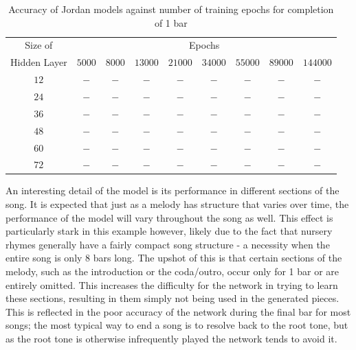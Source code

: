 \documentclass[ author={Stephen Livermore-Tozer},
				supervisor={Dr. Peter Flach},
				degree={MEng},
				title={Algorithmic Co-composition Using Machine Learning},
				subtitle={},
				type={research},
				year={2016} ]{dissertation}
\begin{document}
	\begin{table}[htp]
		\begin{center}
			\begin{tabular}{ccccccccc}
				\toprule
				Size of& \multicolumn{8}{c}{Epochs}\\
				\cline{2-9}
				Hidden Layer& $5000$ & $8000$ & $13000$ & $21000$ & $34000$ & $55000$ & $89000$ & $144000$\\
				\hline
				$12$ & $-$ & $-$ & $-$ & $-$ & $-$ & $-$ & $-$ & $-$\\
				$24$ & $-$ & $-$ & $-$ & $-$ & $-$ & $-$ & $-$ & $-$\\
				$36$ & $-$ & $-$ & $-$ & $-$ & $-$ & $-$ & $-$ & $-$\\
				$48$ & $-$ & $-$ & $-$ & $-$ & $-$ & $-$ & $-$ & $-$\\
				$60$ & $-$ & $-$ & $-$ & $-$ & $-$ & $-$ & $-$ & $-$\\
				$72$ & $-$ & $-$ & $-$ & $-$ & $-$ & $-$ & $-$ & $-$\\
				\bottomrule
			\end{tabular}
		\end{center}
		\caption{Accuracy of Jordan models against number of training epochs for completion of 1 bar}
		\label{tab:jordan-1-bar-results}
	\end{table}
	
	An interesting detail of the model is its performance in different sections of the song. It is expected that just as a melody has structure that varies over time, the performance of the model will vary throughout the song as well. This effect is particularly stark in this example however, likely due to the fact that nursery rhymes generally have a fairly compact song structure - a necessity when the entire song is only 8 bars long. The upshot of this is that certain sections of the melody, such as the introduction or the coda/outro, occur only for 1 bar or are entirely omitted. This increases the difficulty for the network in trying to learn these sections, resulting in them simply not being used in the generated pieces. This is reflected in the poor accuracy of the network during the final bar for most songs; the most typical way to end a song is to resolve back to the root tone, but as the root tone is otherwise infrequently played the network tends to avoid it. 
	
	
\end{document}
